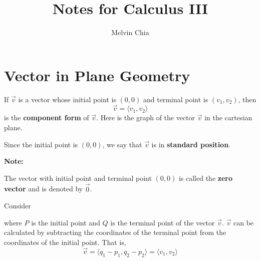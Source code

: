 \documentclass{report}
\title{Notes for Calculus III}
\author{Melvin Chia}
\begin{document}
\maketitle

\tableofcontents

\onehalfspacing

\chapter{Vector in Plane Geometry}

If $\vec{v}$ is a vector whose initial point is $(0, 0)$ and terminal point is
$(v_1, v_2)$, then \[\vec{v} = \langle v_1, v_2 \rangle\] is the \textbf{component form} of $\vec{v}$. Here is the graph of the vector
$\vec{v}$ in the cartesian plane.
\begin{center}
\end{center}
Since the initial point is $(0, 0)$, we say that $\vec{v}$ is in \textbf{standard position}.\\

\begin{framed}
    \noindent\textbf{Note: }

    \noindent The vector with initial point and terminal point $(0, 0)$ is called the
    \textbf{zero vector} and is denoted by $\vec{0}$.
\end{framed}

\newpage
\noindent Consider
\begin{center}
\end{center}
where $P$ is the initial point and $Q$ is the terminal point of the vector $\vec{v}$. $\vec{v}$ can be calculated by subtracting the coordinates of the terminal point from the coordinates of the initial point. That is, \[\vec{v} = \langle q_1 - p_1, q_2 - p_2 \rangle = \langle v_1, v_2 \rangle\]
\end{document}
